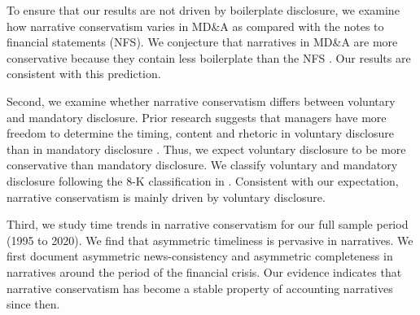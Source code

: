 \documentclass[letterpaper,12pt]{article}
\begin{document}
\begin{spacing}{1.5}
To ensure that our results are not driven by boilerplate disclosure, we examine how narrative conservatism varies in MD\&A as compared with the notes to financial statements (NFS). We conjecture that narratives in MD\&A are more conservative because they contain less boilerplate than the NFS \cite{secFinancialReportingManual2019}. Our results are consistent with this prediction. 

Second, we examine whether narrative conservatism differs between voluntary and mandatory disclosure. Prior research suggests that managers have more freedom to determine the timing, content and rhetoric in voluntary disclosure than in mandatory disclosure \cite{segalAreManagersStrategic2016}. Thus, we expect voluntary disclosure to be more conservative than mandatory disclosure. We classify voluntary and mandatory disclosure following the 8-K classification in . Consistent with our expectation, narrative conservatism is mainly driven by voluntary disclosure. 

Third, we study time trends in narrative conservatism for our full sample period (1995 to 2020). We find that asymmetric timeliness is pervasive in narratives. We first document asymmetric news-consistency and asymmetric completeness in narratives around the period of the financial crisis. Our evidence indicates that narrative conservatism has become a stable property of accounting narratives since then.



\end{spacing}
\end{document}
